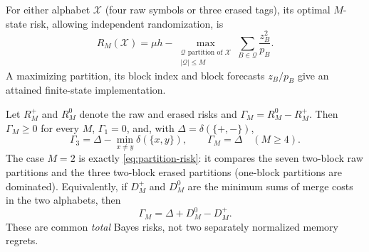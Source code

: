 \begin{theorem}\label{thm:finite-bit-value}
For either alphabet $\mathcal X$ (four raw symbols or three erased tags),
its optimal $M$-state risk, allowing independent randomization, is
\begin{equation}\label{eq:partition-risk}
 R_M(\mathcal X)=\mu h-
  \max_{\substack{\mathcal Q\text{ partition of }\mathcal X\\|\mathcal Q|\le M}}
             \sum_{B\in\mathcal Q}\frac{z_B^2}{p_B}.
\end{equation}
A maximizing partition, its block index and block forecasts $z_B/p_B$
give an attained finite-state implementation.

Let $R_M^+$ and $R_M^0$ denote the raw and erased risks and
$\Gamma_M=R_M^0-R_M^+$. Then $\Gamma_M\ge0$ for every $M$,
$\Gamma_1=0$, and, with $\Delta=\delta(\{+,-\})$,
\begin{equation}\label{eq:all-budgets}
 \Gamma_3=\Delta-\min_{x\ne y}\delta(\{x,y\}),\qquad
 \Gamma_M=\Delta\quad(M\ge4).
\end{equation}
The case $M=2$ is exactly \eqref{eq:partition-risk}: it compares the seven
two-block raw partitions and the three two-block erased partitions
(one-block partitions are dominated). Equivalently, if
$D_M^+$ and $D_M^0$ are the minimum sums of merge costs in the two
alphabets, then
\begin{equation}\label{eq:common-decomposition}
 \Gamma_M=\Delta+D_M^0-D_M^+.
\end{equation}
These are common \emph{total} Bayes risks, not two separately normalized
memory regrets.
\end{theorem}
